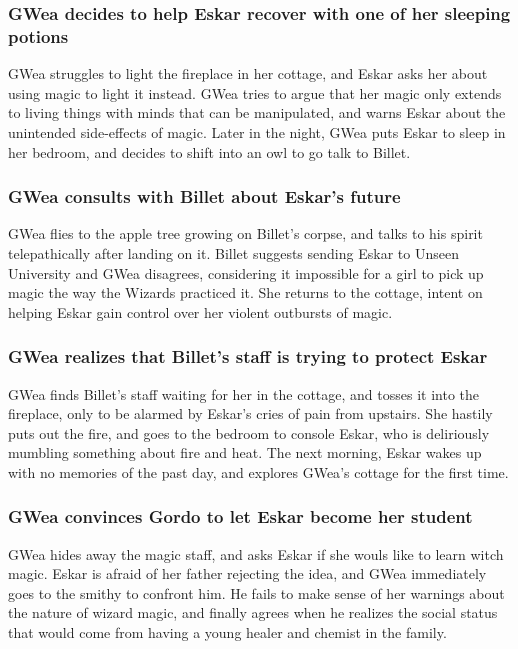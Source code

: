 \subsubsection{\Gls{GWea} decides to help \Gls{Eskar} recover with one of her sleeping potions}
\Gls{GWea} struggles to light the fireplace in her cottage, and \Gls{Eskar} asks her about using
magic to light it instead. \Gls{GWea} tries to argue that her magic only extends to living things
with minds that can be manipulated, and warns \Gls{Eskar} about the unintended side-effects of
magic. Later in the night, \Gls{GWea} puts \Gls{Eskar} to sleep in her bedroom, and decides to
shift into an owl to go talk to \Gls{Billet}.

\subsubsection{\Gls{GWea} consults with \Gls{Billet} about \Gls{Eskar}'s future}
\Gls{GWea} flies to the apple tree growing on \Gls{Billet}'s corpse, and talks to his spirit
telepathically after landing on it. \Gls{Billet} suggests sending \Gls{Eskar} to Unseen University
and \Gls{GWea} disagrees, considering it impossible for a girl to pick up magic the way the Wizards
practiced it. She returns to the cottage, intent on helping \Gls{Eskar} gain control over her
violent outbursts of magic.

\subsubsection{\Gls{GWea} realizes that \Gls{Billet}'s staff is trying to protect \Gls{Eskar}}
\Gls{GWea} finds \Gls{Billet}'s staff waiting for her in the cottage, and tosses it into the
fireplace, only to be alarmed by \Gls{Eskar}'s cries of pain from upstairs. She hastily puts out
the fire, and goes to the bedroom to console \Gls{Eskar}, who is deliriously mumbling something
about fire and heat. The next morning, \Gls{Eskar} wakes up with no memories of the past day,
and explores \Gls{GWea}'s cottage for the first time.

\subsubsection{\Gls{GWea} convinces \Gls{Gordo} to let \Gls{Eskar} become her student}
\Gls{GWea} hides away the magic staff, and asks \Gls{Eskar} if she wouls like to learn witch magic.
\Gls{Eskar} is afraid of her father rejecting the idea, and \Gls{GWea} immediately goes to the
smithy to confront him. He fails to make sense of her warnings about the nature of wizard magic,
and finally agrees when he realizes the social status that would come from having a young healer and
chemist in the family.

